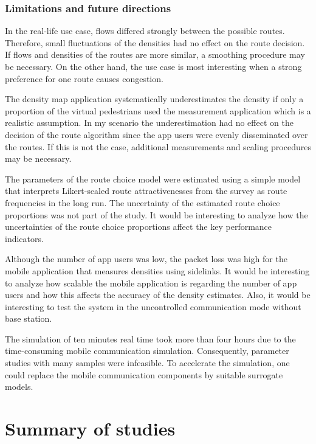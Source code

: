 \subsubsection{Limitations and future directions}



In the real-life use case, flows differed strongly between the possible routes. Therefore, small fluctuations of the densities had no effect on the route decision. If flows and densities of the routes are more similar, a smoothing procedure may be necessary. On the other hand, the use case is most interesting when a strong preference for one route causes congestion.

The density map application systematically underestimates the density if only a proportion of the virtual pedestrians used the measurement application which is a realistic assumption. In my scenario the underestimation had no effect on the decision of the route algorithm since the app users were evenly disseminated over the routes. If this is not the case, additional measurements and scaling procedures may be necessary. 

The parameters of the route choice model were estimated using a simple model that interprets Likert-scaled route attractivenesses from the survey as route frequencies in the long run. The uncertainty of the estimated route choice proportions was not part of the study. It would be interesting to analyze how the uncertainties of the route choice proportions affect the key performance indicators. 

Although the number of app users was low, the packet loss was high for the mobile application that measures densities using sidelinks. It would be interesting to analyze how scalable the mobile application is regarding the number of app users and how this affects the accuracy of the density estimates. Also, it would be interesting to test the system in the uncontrolled communication mode without base station.

The simulation of ten minutes real time took more than four hours due to the time-consuming mobile communication simulation. Consequently, parameter studies with many samples were infeasible. To accelerate the simulation, one could replace the mobile communication components by suitable surrogate models. 


\section{Summary of studies}



